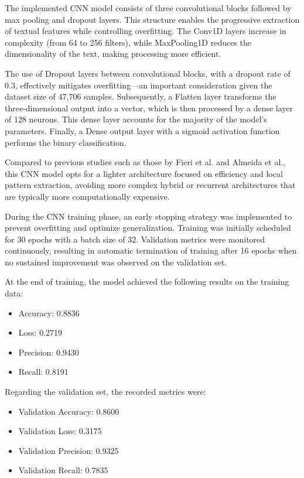 The implemented CNN model consists of three convolutional blocks followed by max pooling and dropout layers. This structure enables the progressive extraction of textual features while controlling overfitting. The Conv1D layers increase in complexity (from 64 to 256 filters), while MaxPooling1D reduces the dimensionality of the text, making processing more efficient.

The use of Dropout layers between convolutional blocks, with a dropout rate of 0.3, effectively mitigates overfitting—an important consideration given the dataset size of 47,706 samples. Subsequently, a Flatten layer transforms the three-dimensional output into a vector, which is then processed by a dense layer of 128 neurons. This dense layer accounts for the majority of the model’s parameters. Finally, a Dense output layer with a sigmoid activation function performs the binary classification.

Compared to previous studies such as those by Fieri et al. and Almeida et al., this CNN model opts for a lighter architecture focused on efficiency and local pattern extraction, avoiding more complex hybrid or recurrent architectures that are typically more computationally expensive.

During the CNN training phase, an early stopping strategy was implemented to prevent overfitting and optimize generalization. Training was initially scheduled for 30 epochs with a batch size of 32. Validation metrics were monitored continuously, resulting in automatic termination of training after 16 epochs when no sustained improvement was observed on the validation set.

At the end of training, the model achieved the following results on the training data:

\begin{itemize}
    \item Accuracy: 0.8836
    \item Loss: 0.2719
    \item Precision: 0.9430
    \item Recall: 0.8191
\end{itemize}

Regarding the validation set, the recorded metrics were:

\begin{itemize}
    \item Validation Accuracy: 0.8600
    \item Validation Loss: 0.3175
    \item Validation Precision: 0.9325
    \item Validation Recall: 0.7835
\end{itemize}

